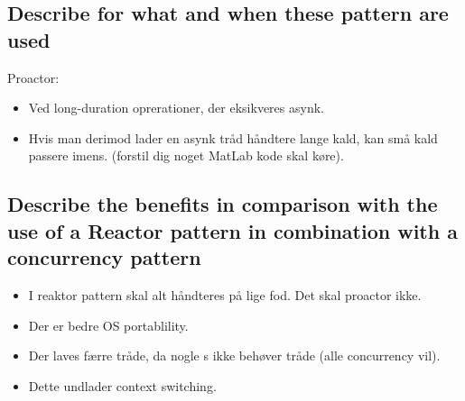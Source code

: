 \documentclass{article}
\begin{document}
\subsection{Describe for what and when these pattern are used}

Proactor:
\vspace{-10pt}
\begin{itemize}
	\item Ved long-duration oprerationer, der eksikveres asynk.
	\item Hvis man derimod lader en asynk tråd håndtere lange kald, kan små kald passere imens. (forstil dig noget MatLab kode skal køre).
\end{itemize}


\subsection{Describe the benefits in comparison with the use of a Reactor pattern in combination with a concurrency pattern}


\begin{itemize}
	\item I reaktor pattern skal alt håndteres på lige fod. Det skal proactor ikke.
	\item Der er bedre OS portablility.
	\item Der laves færre tråde, da nogle s ikke behøver tråde (alle concurrency vil).
	\item Dette undlader context switching.
\end{itemize}
\end{document}
